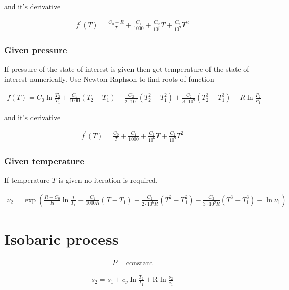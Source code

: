 \documentclass{article}
\begin{document}
	and it's derivative

	\begin{align*}
		f^\prime(T) = \frac{C_0 - R}{T} + \frac{C_1}{1000} + \frac{C_2}{10^6}T + \frac{C_2}{10^9}T^2
	\end{align*}

	\subsubsection{Given pressure}

	If pressure of the state of interest is given then get temperature of the state of interest numerically. Use Newton-Raphson to find roots of function

	\begin{align*}
		f(T) = C_0\ln\frac{T_2}{T_1} + \frac{C_1}{1000}(T_2 - T_1) + \frac{C_2}{2\cdot10^6}(T_2^2 - T_1^2) + \frac{C_2}{3\cdot10^9}(T_2^3 - T_1^3) - R\ln\frac{P_2}{P_1}
	\end{align*}
	
	and it's derivative

	\begin{align*}
		f^\prime(T) = \frac{C_0}{T} + \frac{C_1}{1000} + \frac{C_2}{10^6}T + \frac{C_2}{10^9}T^2
	\end{align*}

	\subsubsection{Given temperature}

	If temperature $T$ is given no iteration is required.

	\begin{align*}
		\nu_2 = \exp\left(\frac{R - C_0}{R}\ln\frac{T}{T_1} - \frac{C_1}{1000R}(T - T_1) - \frac{C_2}{2\cdot10^6R}(T^2 - T_1^2) - \frac{C_2}{3\cdot10^9R}(T^3 - T_1^3) - \ln\nu_1\right)
	\end{align*}

	\section{Isobaric process}

	\begin{align*}
		P = \text{constant}
	\end{align*}

	\begin{align*}
		s_2 = s_1 + c_\nu \ln\frac{T_2}{T_1} + \text{R}\ln\frac{\nu_2}{\nu_1}
	\end{align*}
\end{document}
